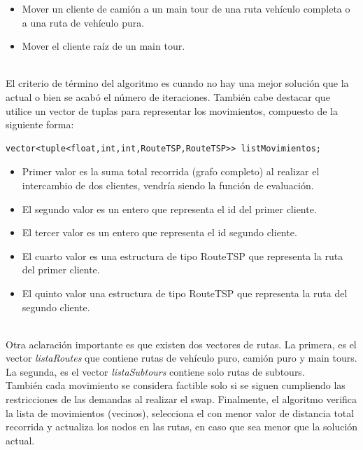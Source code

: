 \documentclass[letter, 10pt]{article}
\begin{document}
\begin{itemize}
    \item Mover un cliente de camión a un main tour de una ruta vehículo completa o a una ruta de vehículo pura.
    \item Mover el cliente raíz de un main tour.
\end{itemize}
\\
El criterio de término del algoritmo es cuando no hay una mejor solución que la actual o bien se acabó el número de iteraciones. También cabe destacar que utilice un vector de tuplas para representar los movimientos, compuesto de la siguiente forma:
\begin{verbatim}
vector<tuple<float,int,int,RouteTSP,RouteTSP>> listMovimientos;
\end{verbatim}
\begin{itemize}
    \item Primer valor es la suma total recorrida (grafo completo) al realizar el intercambio de dos clientes, vendría siendo la función de evaluación.
    \item El segundo valor es un entero que representa el id del primer cliente.
    \item El tercer valor es un entero que representa el id segundo cliente.
    \item El cuarto valor es una estructura de tipo RouteTSP que representa la ruta del primer cliente.
    \item  El quinto valor una estructura de tipo RouteTSP que representa la ruta del segundo cliente.
\end{itemize}
\\
Otra aclaración importante es que existen dos vectores de rutas. La primera, es el vector \textit{listaRoutes} que contiene rutas de vehículo puro, camión puro y main tours. La segunda, es el vector \textit{listaSubtours} contiene solo rutas de subtours. \\También cada movimiento se considera factible solo si se siguen cumpliendo las restricciones de las demandas al realizar el swap. Finalmente, el algoritmo verifica la lista de movimientos (vecinos), selecciona el con menor valor de distancia total recorrida y actualiza los nodos en las rutas, en caso que sea menor que la solución actual.
\end{document}

